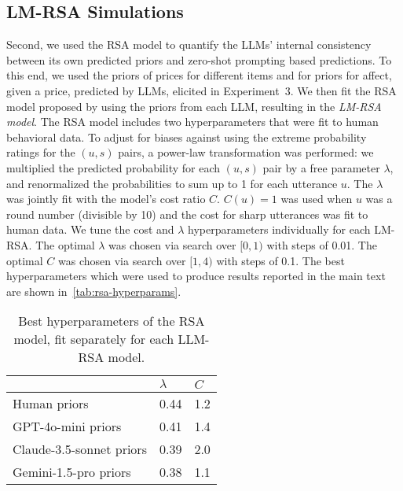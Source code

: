 \subsection{LM-RSA Simulations}
Second, we used the RSA model to quantify the LLMs' internal consistency between its own predicted priors and zero-shot prompting based predictions.
To this end, we used the priors of prices for different items and for priors for affect, given a price, predicted by LLMs, elicited in Experiment~3.
We then fit the RSA model proposed by \citet{kao2014nonliteral} using the priors from each LLM, resulting in the \textit{LM-RSA model}.
The RSA model includes two hyperparameters that were fit to human behavioral data. 
To adjust for biases against using the extreme probability ratings for the $(u,s)$ pairs, a power-law transformation was performed: we
multiplied the predicted probability for each $(u,s)$ pair by a free parameter $\lambda$, and renormalized the probabilities to sum up to 1 for each utterance $u$. 
The $\lambda$ was jointly fit with the model’s cost ratio $C$. 
$C(u) = 1$ was used when $u$ was a round number (divisible by 10) and the cost for sharp utterances was fit to human data.
We tune the cost and $\lambda$ hyperparameters individually for each LM-RSA. 
The optimal $\lambda$ was chosen via search over $[0, 1)$ with steps of 0.01. The optimal $C$ was chosen via search over $[1, 4)$ with steps of 
0.1. The best hyperparameters which were used to produce results reported in the main text are shown in~\autoref{tab:rsa-hyperparams}.
\begin{table}[h]
\centering
\begin{tabular}{lll}
\toprule
                   & $\lambda$ & $C$ \\ 
\midrule
Human priors       & 0.44   & 1.2  \\ 
GPT-4o-mini priors & 0.41   & 1.4   \\ 
Claude-3.5-sonnet priors & 0.39   & 2.0   \\ 
Gemini-1.5-pro priors & 0.38 & 1.1 \\ 
\bottomrule
\end{tabular}
\caption{Best hyperparameters of the RSA model, fit separately for each LLM-RSA model. \label{tab:rsa-hyperparams}}
\end{table}

